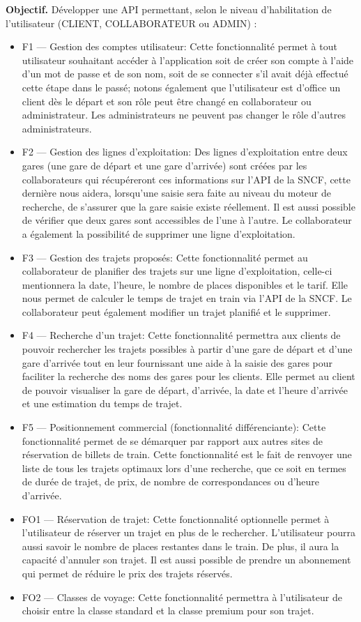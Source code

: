 \documentclass[12pt,a4paper]{report}
\begin{document}
\noindent\textbf{Objectif.} Développer une API permettant, selon le niveau
d'habilitation de l'utilisateur (CLIENT, COLLABORATEUR ou ADMIN) :
\begin{itemize}
    \item F1 --- Gestion des comptes utilisateur: Cette fonctionnalité permet à tout utilisateur souhaitant accéder à l'application soit de créer son compte à l'aide d'un mot de passe et de son nom, soit de se connecter s'il avait déjà effectué cette étape dans le passé; notons également que l'utilisateur est d'office un client dès le départ et son rôle peut être changé en collaborateur ou administrateur. Les administrateurs ne peuvent pas changer le rôle d'autres administrateurs.
    \item F2 --- Gestion des lignes d'exploitation: Des lignes d'exploitation entre deux gares (une gare de départ et une gare d'arrivée) sont créées par les collaborateurs qui récupéreront ces informations sur l'API de la SNCF, cette dernière nous aidera, lorsqu'une saisie sera faite au niveau du moteur de recherche, de s'assurer que la gare saisie existe réellement. Il est aussi possible de vérifier que deux gares sont accessibles de l'une à l'autre. Le collaborateur a également la possibilité de supprimer une ligne d'exploitation.
    \item F3 --- Gestion des trajets proposés: Cette fonctionnalité permet au collaborateur de planifier des trajets sur une ligne d'exploitation, celle-ci mentionnera la date, l'heure, le nombre de places disponibles et le tarif. Elle nous permet de calculer le temps de trajet en train via l'API de la SNCF. Le collaborateur peut également modifier un trajet planifié et le supprimer.
    \item F4 --- Recherche d'un trajet: Cette fonctionnalité permettra aux clients de pouvoir rechercher les trajets possibles à partir d'une gare de départ et d'une gare d'arrivée tout en leur fournissant une aide à la saisie des gares pour faciliter la recherche des noms des gares pour les clients. Elle permet au client de pouvoir visualiser la gare de départ, d'arrivée, la date et l'heure d'arrivée et une estimation du temps de trajet.
    \item F5 --- Positionnement commercial (fonctionnalité différenciante): Cette fonctionnalité permet de se démarquer par rapport aux autres sites de réservation de billets de train. Cette fonctionnalité est le fait de renvoyer une liste de tous les trajets optimaux lors d'une recherche, que ce soit en termes de durée de trajet, de prix, de nombre de correspondances ou d'heure d'arrivée.
    \item FO1 --- Réservation de trajet: Cette fonctionnalité optionnelle permet à l'utilisateur de réserver un trajet en plus de le rechercher. L'utilisateur pourra aussi savoir le nombre de places restantes dans le train. De plus, il aura la capacité d'annuler son trajet. Il est aussi possible de prendre un abonnement qui permet de réduire le prix des trajets réservés.
    \item FO2 --- Classes de voyage: Cette fonctionnalité permettra à l'utilisateur de choisir entre la classe standard et la classe premium pour son trajet.

\end{itemize}
\end{document}
